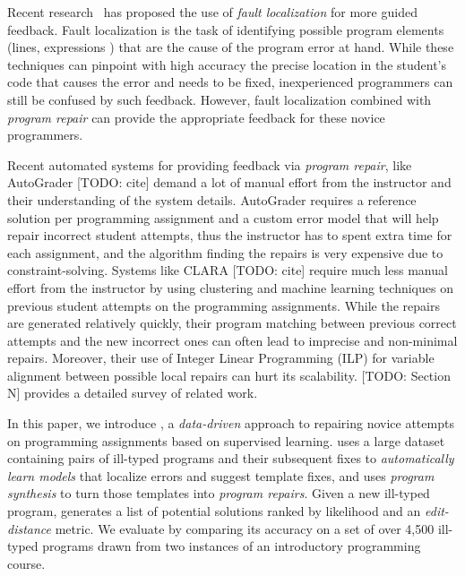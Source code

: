 Recent research~\citep[][]{Seidel:2017, Zhang2014-lv} has proposed the use of
\emph{fault localization} for more guided feedback. Fault localization is the
task of identifying possible program elements (\eg lines, expressions \etc) that
are the cause of the program error at hand. While these techniques can pinpoint
with high accuracy the precise location in the student's code that causes the
error and needs to be fixed, inexperienced programmers can still be confused by
such feedback. However, fault localization combined with \emph{program repair}
can provide the appropriate feedback for these novice programmers.

Recent automated systems for providing feedback via \emph{program repair}, like
AutoGrader [TODO: cite] demand a lot of manual effort from the instructor and
their understanding of the system details. AutoGrader requires a reference
solution per programming assignment and a custom error model that will help
repair incorrect student attempts, thus the instructor has to spent extra time
for each assignment, and the algorithm finding the repairs is very
expensive due to constraint-solving. Systems like CLARA [TODO: cite] require
much less manual effort from the instructor by using clustering and machine
learning techniques on previous student attempts on the programming assignments.
While the repairs are generated relatively quickly, their program matching
between previous correct attempts and the new incorrect ones can often lead to
imprecise and non-minimal repairs. Moreover, their use of Integer Linear
Programming (ILP) for variable alignment between possible local repairs can hurt
its scalability. [TODO: Section N] provides a detailed survey of related work.

In this paper, we introduce \toolname, a \emph{data-driven} approach to
repairing novice attempts on programming assignments based on supervised
learning. \toolname uses a large dataset containing pairs of ill-typed programs and
their subsequent fixes to \emph{automatically learn models} that localize
errors and suggest template fixes, and uses \emph{program synthesis} to turn those
templates into \emph{program repairs}. Given a new ill-typed program, \toolname
generates a list of potential solutions ranked by likelihood and an
\emph{edit-distance} metric. We evaluate \toolname by comparing its accuracy on
a set of over 4,500 ill-typed \ocaml programs drawn from two instances of an
introductory programming course.


